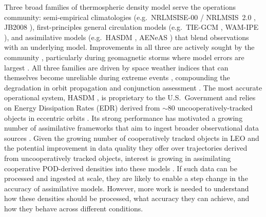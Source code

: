 \documentclass{agujournal2019}
\begin{document}
Three broad families of thermospheric density model serve the operations community: semi-empirical climatologies (e.g.\ NRLMSISE-00 \cite{Picone2002NRLMSISE-00Issues} / NRLMSIS~2.0 \cite{Emmert2021NRLMSISDensities}, JB2008 \cite{Bowman2008AIndices}), first-principles general circulation models (e.g.\ TIE-GCM \cite{Qian2014TheSystem, Wu2025NCAR-TIEGCMV3}, WAM-IPE \cite{Akmaev2011WholeWeather}), and assimilative models (e.g.\ HASDM \cite{Storz2002HighHASDM}, AENeAS \cite{Elvidge2019UsingModelling}) that blend observations with an underlying model. Improvements in all three are actively sought by the community \cite{Mutschler2023AOperations, Mehta2022SatelliteOperations}, particularly during geomagnetic storms where model errors are largest \cite{Bruinsma2018SpaceOrbit, Bruinsma2021ThermosphereStorms}. All three families are driven by space weather indices that can themselves become unreliable during extreme events \cite{Shprits2019NowcastingObservations, Yamazaki2024AssessmentIndices}, compounding the degradation in orbit propagation and conjunction assessment \cite{Parker2024InfluencesAssessment}. The most accurate operational system, HASDM \cite{Storz2002HASDMRates, Picone2005ThermosphericSets}, is proprietary to the U.S.\ Government and relies on Energy Dissipation Rates (EDR) derived from $\sim$80 uncooperatively-tracked objects in eccentric orbits \cite{Storz2002HASDMRates}. Its strong performance has motivated a growing number of assimilative frameworks that aim to ingest broader observational data sources \cite{Sutton2018AThermosphere, Gondelach2020, Elvidge2019UsingModelling, Brown2024UsingSolutions}. Given the growing number of cooperatively tracked objects in LEO and the potential improvement in data quality they offer over trajectories derived from uncooperatively tracked objects, interest is growing in assimilating cooperative POD-derived densities into these models \cite{Mutschler2023Physics-BasedData, Fitzpatrick2024ApplyingSatellite}. If such data can be processed and ingested at scale, they are likely to enable a step change in the accuracy of assimilative models. However, more work is needed to understand how these densities should be processed, what accuracy they can achieve, and how they behave across different conditions.
\end{document}
